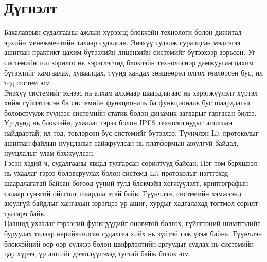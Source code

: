 \chapter{Дүгнэлт}
\indent Бакалаврын судалгааны ажлын хүрээнд блокчэйн технологи болон дижитал эрхийн менежментийн талаар судалсан. Энэхүү судалж суралцсан мэдлэгээ ашиглан практикт цахим бүтээлийн лицензийн системийг бүтээхээр зорьсон. Уг системийн гол зорилго нь хэрэглэгчид блокчэйн технологиор дамжуулан цахим бүтээлийг хамгаалах, хуваалцах, түүнд хандах зөвшөөрөл олгох төвлөрсөн бус, ил тод систем юм.
\\ \indent Энэхүү системийг эхнээс нь алхам алхмаар шаардлагаас нь хэрэгжүүлэлт хүртэл хийж гүйцэтгэсэн ба системийн функциональ ба функциональ бус шаардлагыг боловсруулж түүнээс системийн статик болон динамик загварыг гаргасан билээ. Үр дүнд нь блокчэйн, ухаалаг гэрээ болон IPFS технологиудыг ашиглан найдвартай, ил тод, төвлөрсөн бус системийг бүтээлээ. Түүнчлэн Lit протоколыг ашиглан файлын нууцлалыг сайжруулсан нь платформын аюулгүй байдал, нууцлалыг улам бэхжүүлсэн.
\\ \indent Гэсэн хэдий ч, судалгааны явцад тулгарсан сорилтууд байсан. Нэг том бэрхшээл нь ухаалаг гэрээ боловсруулах болон системд Lit протоколыг нэгтгэхэд шаардлагатай байсан бөгөөд үүний тулд блокчэйн хөгжүүлэлт, криптографын талаар гүнзгий ойлголт шаардлагатай байв. Түүнчлэн, системийн хэмжээнд аюулгүй байдлыг хангахын зэрэгцээ үр ашиг, хурдыг хадгалахад тогтмол сорилт тулгарч байв.
\\ \indent  Цаашид ухаалаг гэрээний функцүүдийг оновчтой болгох, гүйлгээний шимтгэлийг буруулах талаар нарийвчилсан судалгаа хийх нь зүйтэй гэж үзэж байна. Түүнчлэн блокчэйний өөр өөр сүлжээ болон шифрлэлтийн аргуудыг судлах нь системийн цар хүрээ, үр ашгийг дээшлүүлэхэд тустай байж болох юм.